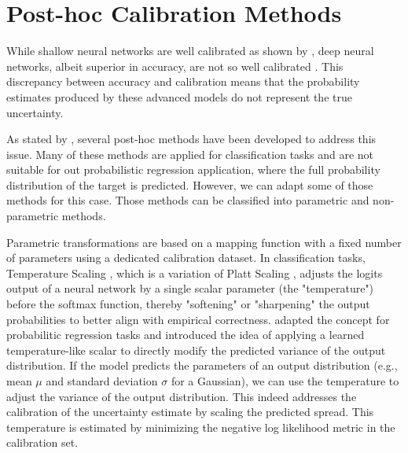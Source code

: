 \documentclass[12pt,a4paper]{book}
\begin{document}
\section{Post-hoc Calibration Methods} 
\label{exp:posthoc}
While shallow neural networks are well calibrated as shown by \citep{niculescu-mizil_predicting_2005}, deep neural networks, albeit superior in accuracy, are not so well calibrated \citep{guo_calibration_2017}. This discrepancy between accuracy and calibration means that the probability estimates produced by these advanced models do not represent the true uncertainty.

As stated by \citep{wang_calibration_2024}, several post-hoc methods have been developed to address this issue. Many of these methods are applied for classification tasks and are not suitable for out probabilistic regression application, where the full probability distribution of the target is predicted. However, we can adapt some of those methods for this case. Those methods can be classified into parametric and non-parametric methods.

Parametric transformations are based on a mapping function with a fixed number of parameters using a dedicated calibration dataset. In classification tasks, Temperature Scaling \citep{guo_calibration_2017}, which is a variation of Platt Scaling \citep{Platt1999}, adjusts the logits output of a neural network by a single scalar parameter (the "temperature") before the softmax function, thereby "softening" or "sharpening" the output probabilities to better align with empirical correctness. \citet{kuleshov18a} adapted the concept for probabilitic regression tasks and introduced the idea of applying a learned temperature-like scalar to directly modify the predicted variance of the output distribution. If the model predicts the parameters of an output distribution (e.g., mean $\mu$ and standard deviation $\sigma$ for a Gaussian), we can use the temperature to adjust the variance of the output distribution. This indeed addresses the calibration of the uncertainty estimate by scaling the predicted spread. This temperature is estimated by minimizing the negative log likelihood metric in the calibration set.
\end{document}
